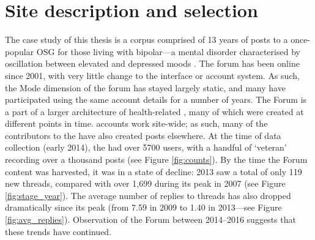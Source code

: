 
\section{Site description and selection}

The case study of this thesis is a \gls{corpus} comprised of 13 years of \glspl{post} to a once\hyp{}popular \gls{OSG} for those living with \gls{bipolar}---a mental disorder characterised by oscillation between elevated and depressed moods \cite{anderson_bipolar_2012}. The \gls{forum} has been online since 2001, with very little change to the interface or account system. As such, the \gls{Mode} dimension of the \gls{forum} has stayed largely static, and many  have participated using the same account details for a number of years. The \gls{Forum} is a part of a larger architecture of health-related , many of which were created at different points in time.  accounts work site\hyp{}wide; as such, many of the contributors to the  have also created \glspl{post} elsewhere. At the time of data collection (early 2014), the  had over 5700 users, with a handful of `veteran'  recording over a thousand \glspl{post} (see Figure \ref{fig:counts}). By the time the \gls{Forum} content was harvested, it was in a state of decline: 2013 saw a total of only 119 new \glspl{thread}, compared with over 1,699 during its peak in 2007 (see Figure \ref{fig:stage_year}). The average number of replies to \glspl{thread} has also dropped dramatically since its peak (from 7.59 in 2009 to 1.40 in 2013---see Figure \ref{fig:avg_replies}). Observation of the \gls{Forum} between 2014--2016 suggests that these trends have continued.

